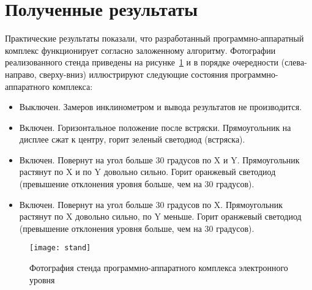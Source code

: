 \documentclass[document.tex]{subfiles}
\begin{document}
\section{Полученные результаты}
Практические результаты показали, что разработанный программно-аппа\-ратный комп\-лекс функционирует согласно заложенному алгоритму. Фотографии реализованного стенда приве\-дены на
рисунке~\ref{fig:stand} и в порядке очередности (слева-направо, сверху-вниз) иллюстриру\-ют следующие состояния программно-аппа\-ратного комплекса:
\begin{itemize}
  \item Выключен. Замеров инклинометром и вывода результатов не производится.
  \item Включен. Горизонтальное положение после встряски. Прямоугольник на дисплее сжат к центру, горит зеленый светодиод (встряска).
  \item Включен. Повернут на угол больше 30 градусов по X и Y. Прямоугольник растянут по X и по Y довольно сильно. Горит оранжевый светодиод (превышение отклонения
  уровня больше, чем на 30 градусов).
  \item Включен. Повернут на угол больше 30 градусов по X. Прямоугольник растянут по X довольно сильно, по Y меньше. Горит оранжевый светодиод (превышение отклонения
  уровня больше, чем на 30 градусов).
\end{itemize}
\begin{figure}[h]
\centering
\texttt{[image: stand]}
\caption{Фотография стенда программно-аппаратного комплекса электронного уровня}
\label{fig:stand}
\end{figure}
\end{document}
